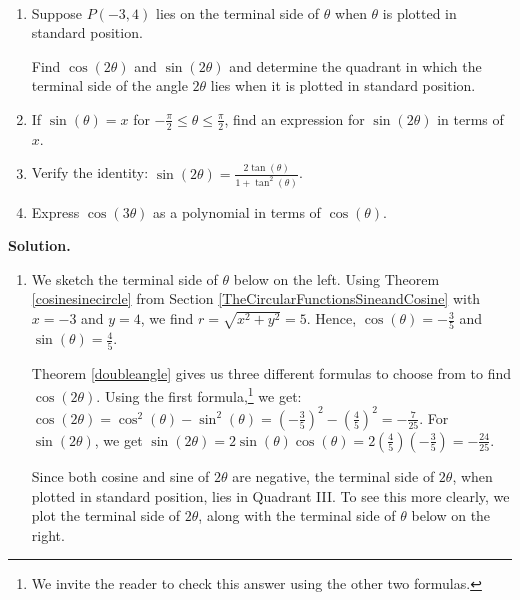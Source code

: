 \documentclass{ximera}
\begin{document}
\begin{example}  \label{doubleangleex} $~$

\begin{enumerate}

\item Suppose $P(-3,4)$ lies on the terminal side of $\theta$ when $\theta$ is plotted in standard position. 

 

 Find $\cos(2\theta)$ and $\sin(2\theta)$ and determine the quadrant in which the terminal side of the angle $2\theta$ lies when it is plotted in standard position.

\item  If $\sin(\theta) = x$ for $-\frac{\pi}{2} \leq \theta \leq \frac{\pi}{2}$, find an expression for $\sin(2\theta)$ in terms of $x$.

\item  \label{doubleanglesinewtan} Verify the identity:  $\sin(2\theta) =  \frac{2\tan(\theta)}{1 + \tan^{2}(\theta)}$.

\item  Express $\cos(3\theta)$ as a polynomial in terms of $\cos(\theta)$.
\label{cosinepolynomial}

\end{enumerate}


{\bf Solution.}

\begin{enumerate}

\item  We sketch the terminal side of $\theta$ below on the left.  Using Theorem \ref{cosinesinecircle} from Section \ref{TheCircularFunctionsSineandCosine} with  $x = -3$ and $y=4$, we find $r = \sqrt{x^2+y^2} = 5$.  Hence, $\cos(\theta) = -\frac{3}{5}$ and $\sin(\theta) = \frac{4}{5}$.  

 

 Theorem \ref{doubleangle} gives us three different formulas to choose from to find $\cos(2\theta)$. Using the first formula,\footnote{We invite the reader to check this answer using the other two formulas.} we get: $\cos(2\theta) = \cos^{2}(\theta) - \sin^{2}(\theta) = \left(-\frac{3}{5}\right)^2 - \left(\frac{4}{5}\right)^2 = -\frac{7}{25}$.    For $\sin(2\theta)$, we get $\sin(2\theta) = 2 \sin(\theta) \cos(\theta) = 2 \left(\frac{4}{5}\right)\left(-\frac{3}{5}\right) = -\frac{24}{25}$.  

 

Since both cosine and sine of $2\theta$ are negative, the terminal side of $2\theta$, when plotted in standard position, lies in Quadrant III.  To see this more clearly, we plot the terminal side of $2\theta$, along with the terminal side of $\theta$ below on the right.  


\end{enumerate}
\end{example}
\end{document}

